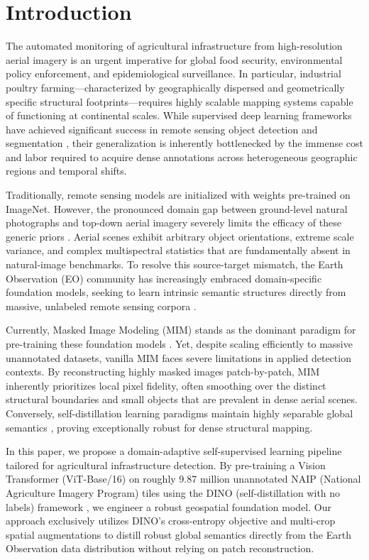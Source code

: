 \section{Introduction}
\label{sec:intro}

The automated monitoring of agricultural infrastructure from high-resolution aerial imagery is an urgent imperative for global food security, environmental policy enforcement, and epidemiological surveillance. In particular, industrial poultry farming---characterized by geographically dispersed and geometrically specific structural footprints---requires highly scalable mapping systems capable of functioning at continental scales. While supervised deep learning frameworks have achieved significant success in remote sensing object detection and segmentation \cite{li2020greenhouse, robinson2021mapping}, their generalization is inherently bottlenecked by the immense cost and labor required to acquire dense annotations across heterogeneous geographic regions and temporal shifts.

Traditionally, remote sensing models are initialized with weights pre-trained on ImageNet. However, the pronounced domain gap between ground-level natural photographs and top-down aerial imagery severely limits the efficacy of these generic priors \cite{wang2022empirical}. Aerial scenes exhibit arbitrary object orientations, extreme scale variance, and complex multispectral statistics that are fundamentally absent in natural-image benchmarks. To resolve this source-target mismatch, the Earth Observation (EO) community has increasingly embraced domain-specific foundation models, seeking to learn intrinsic semantic structures directly from massive, unlabeled remote sensing corpora \cite{sun2023ringmo}.

Currently, Masked Image Modeling (MIM) stands as the dominant paradigm for pre-training these foundation models \cite{tian2023spark, reed2022scale}. Yet, despite scaling efficiently to massive unannotated datasets, vanilla MIM faces severe limitations in applied detection contexts. By reconstructing highly masked images patch-by-patch, MIM inherently prioritizes local pixel fidelity, often smoothing over the distinct structural boundaries and small objects that are prevalent in dense aerial scenes. Conversely, self-distillation learning paradigms maintain highly separable global semantics \cite{caron2021emerging, jain2022multimodal}, proving exceptionally robust for dense structural mapping.

In this paper, we propose a domain-adaptive self-supervised learning pipeline tailored for agricultural infrastructure detection. By pre-training a Vision Transformer (ViT-Base/16) on roughly 9.87 million unannotated NAIP (National Agriculture Imagery Program) tiles using the DINO (self-distillation with no labels) framework \cite{caron2021emerging}, we engineer a robust geospatial foundation model. Our approach exclusively utilizes DINO's cross-entropy objective and multi-crop spatial augmentations to distill robust global semantics directly from the Earth Observation data distribution without relying on patch reconstruction.

